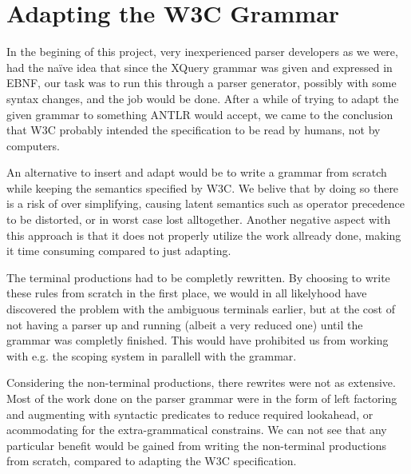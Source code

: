 \section{Adapting the W3C Grammar}
\label{sect:discussion:adaptW3C}

In the begining of this project, very inexperienced parser developers as we
were, had the na\"{i}ve idea that since the XQuery grammar was given and
expressed in EBNF, our task was to run this through a parser generator,
possibly with some syntax changes, and the job would be done. After a while of
trying to adapt the given grammar to something ANTLR would accept, we came to
the conclusion that W3C probably intended the specification to be read by
humans, not by computers. 

An alternative to insert and adapt would be to write a grammar from scratch while keeping the semantics specified by W3C. We belive that by doing so there is a risk of over simplifying, causing latent semantics such as operator precedence to be distorted, or in worst case lost alltogether. Another negative aspect with this approach is that it does not properly utilize the work allready done, making it time consuming compared to just adapting.

The terminal productions had to be completly rewritten. By choosing to write these rules from scratch in the first place, we would in all likelyhood have discovered the problem with the ambiguous terminals earlier, but at the cost of not having a parser up and running (albeit a very reduced one) until the grammar was completly finished. This would have prohibited us from working with e.g. the scoping system in parallell with the grammar.

Considering the non-terminal productions, there rewrites were not as extensive. Most of the work done on the parser grammar were in the form of left factoring and augmenting with syntactic predicates to reduce required lookahead, or acommodating for the extra-grammatical constrains. We can not see that any particular benefit would be gained from writing the non-terminal productions from scratch, compared to adapting the W3C specification.